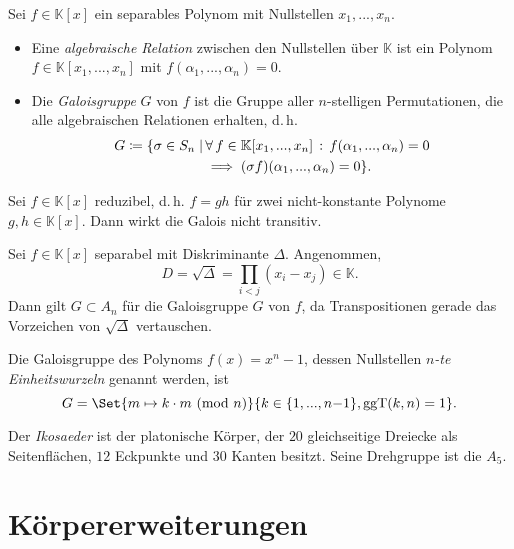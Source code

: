 \documentclass{cheat-sheet}
\newcommand{\K}{\mathbb{K}} %
\DeclareMathOperator{\ggT}{ggT} %
\newcommand{\Mod}[1]{\ (\text{mod}\ #1)} %
\begin{document}
\begin{defn}
  Sei $f \in \K[x]$ ein separables Polynom mit Nullstellen $x_1, ..., x_n$.
  \begin{itemize}
    \item Eine \emph{algebraische Relation} zwischen den Nullstellen über $\K$ ist ein Polynom $f \in \K[x_1, ..., x_n]$ mit $f(\alpha_1, ..., \alpha_n) = 0$.
    \item Die \emph{Galoisgruppe} $G$ von $f$ ist die Gruppe aller $n$-stelligen Permutationen, die alle algebraischen Relationen erhalten, d.\,h.
    \begin{align*}
      G \coloneqq \{ \sigma \in S_n \mid & \, \fa{f \in \K[x_1, ..., x_n]} f(\alpha_1, ..., \alpha_n) = 0 \\
      & \implies (\sigma f)(\alpha_1, ..., \alpha_n) = 0 \}.
    \end{align*}
  \end{itemize}
\end{defn}

\begin{lem}
  Sei $f \in \K[x]$ reduzibel, d.\,h. $f = gh$ für zwei nicht-konstante Polynome $g, h \in \K[x]$. Dann wirkt die Galois nicht transitiv.
\end{lem}

\begin{bsp}
  Sei $f \in \K[x]$ separabel mit Diskriminante $\Delta$. Angenommen,
  \[ D = \sqrt{\Delta} = \prod_{i < j} (x_i - x_j) \in \K. \]
  Dann gilt $G \subset A_n$ für die Galoisgruppe $G$ von $f$, da Transpositionen gerade das Vorzeichen von $\sqrt{\Delta}$ vertauschen.
\end{bsp}

\begin{samepage}

\begin{bsp}
  Die Galoisgruppe des Polynoms $f(x) = x^n - 1$, dessen Nullstellen \emph{$n$-te Einheitswurzeln} genannt werden, ist
  \[ G = \Set{ m \mapsto k \cdot m \Mod{n} }{ k \in \{ 1, ..., n{-}1 \}, \ggT(k, n) = 1 }. \]
\end{bsp}



\begin{bem}
  Der \emph{Ikosaeder} ist der platonische Körper, der $20$ gleichseitige Dreiecke als Seitenflächen, $12$ Eckpunkte und $30$ Kanten besitzt. Seine Drehgruppe ist die $A_5$.
\end{bem}

\section{Körpererweiterungen}

\end{samepage}
\end{document}
